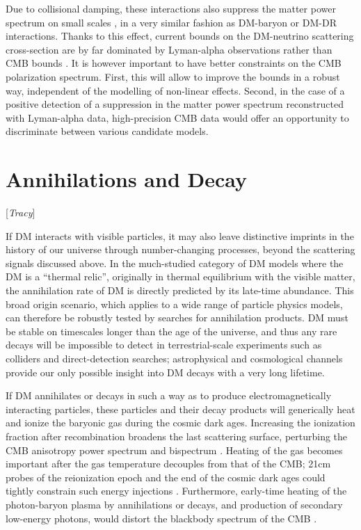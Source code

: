 \documentclass[12pt]{article}
\newcommand{\Contributors}[1]{ {\footnotesize [\textit{#1}]}}
\begin{document}
Due to collisional damping, these interactions also suppress the matter power spectrum on small scales \cite{Boehm:2001hm,Mangano:2006mp}, in a very similar fashion as DM-baryon or DM-DR interactions. Thanks to this effect, current bounds on the DM-neutrino scattering cross-section are by far dominated by Lyman-alpha observations \cite{Wilkinson:2014ksa} rather than CMB bounds \cite{Escudero:2015yka,DiValentino:2017oaw,Diacoumis:2018ezi}. It is however important to have better constraints on the CMB polarization spectrum. First, this will allow to improve the bounds in a robust way, independent of the modelling of non-linear effects. Second, in the case of a positive detection of a suppression in the matter power spectrum reconstructed with Lyman-alpha data, high-precision CMB data would offer an opportunity to discriminate between various candidate models.

\section{Annihilations and Decay}
\Contributors{Tracy}

If DM interacts with visible particles, it may also leave distinctive imprints in the history of our universe through number-changing processes, beyond the scattering signals discussed above. In the much-studied category of DM models where the DM is a ``thermal relic'', originally in thermal equilibrium with the visible matter, the annihilation rate of DM is directly predicted by its late-time abundance. This broad origin scenario, which applies to a wide range of particle physics models, can therefore be robustly tested by searches for annihilation products. DM must be stable on timescales longer than the age of the universe, and thus any rare decays will be impossible to detect in terrestrial-scale experiments such as colliders and direct-detection searches; astrophysical and cosmological channels provide our only possible insight into DM decays with a very long lifetime.

If DM annihilates or decays in such a way as to produce electromagnetically interacting particles, these particles and their decay products will generically heat and ionize the baryonic gas during the cosmic dark ages. Increasing the ionization fraction after recombination broadens the last scattering surface, perturbing the CMB anisotropy power spectrum \cite{Adams:1998nr,Chen:2003gz, Padmanabhan:2005es} and bispectrum \cite{Dvorkin:2013cga}. Heating of the gas becomes important after the gas temperature decouples from that of the CMB; 21cm probes of the reionization epoch and the end of the cosmic dark ages could tightly constrain such energy injections \cite{Furlanetto:2006wp,Valdes:2007cu,Evoli:2014pva,Lopez-Honorez:2016sur,Poulin:2016anj}. Furthermore, early-time heating of the photon-baryon plasma by annihilations or decays, and production of secondary low-energy photons, would  distort the blackbody spectrum of the CMB \cite{Chluba:2013wsa}.
\end{document}
